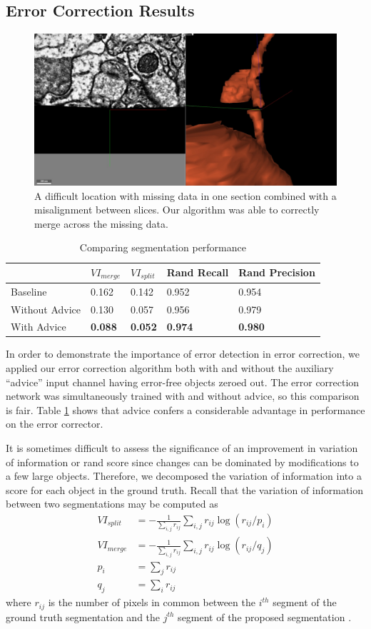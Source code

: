\documentclass{article}
\begin{document}
\subsection{Error Correction Results}
\begin{figure}
\begin{center}
	\includegraphics[width=0.65\linewidth]{difficult.jpg}
	\caption{A difficult location with missing data in one section combined with a misalignment between slices. Our algorithm was able to correctly merge across the missing data.}
	\label{fig:difficult}
\end{center}
\end{figure}
\begin{table}[h]
  \caption{Comparing segmentation performance}
  \label{table:vi_scores}
  \centering
  \begin{tabular}{lllll}
    \toprule
	& $VI_{merge}$ & $VI_{split}$ & Rand Recall & Rand Precision\\
    \midrule
    Baseline & 0.162 & 0.142 & 0.952 & 0.954\\
    Without Advice & 0.130 & 0.057 & 0.956 & 0.979\\
	With Advice & \textbf{0.088} & \textbf{0.052} & \textbf{0.974} & \textbf{0.980}\\
    \bottomrule
  \end{tabular}
\end{table}
In order to demonstrate the importance of error detection in error correction, we applied our error correction algorithm both with and without the auxiliary ``advice'' input channel having error-free objects zeroed out. The error correction network was simultaneously trained with and without advice, so this comparison is fair. Table \ref{table:vi_scores} shows that advice confers a considerable advantage in performance on the error corrector.

It is sometimes difficult to assess the significance of an improvement in variation of information or rand score since changes can be dominated by modifications to a few large objects. Therefore, we decomposed the variation of information into a score for each object in the ground truth. Recall that the variation of information between two segmentations may be computed as 
\begin{align*}
	VI_{split}&=-\frac 1 {\sum_{i,j} r_{ij}} \sum_{i,j} r_{ij} \log(r_{ij}/p_i)\\
	VI_{merge}&=-\frac 1 {\sum_{i,j} r_{ij}} \sum_{i,j} r_{ij} \log(r_{ij}/q_j)\\
	p_i&=\sum_j r_{ij}\\
	q_j&=\sum_i r_{ij}
\end{align*}
where $r_{ij}$ is the number of pixels in common between the $i^{th}$ segment of the ground truth segmentation and the $j^{th}$ segment of the proposed segmentation \cite{vi}.
\end{document}
